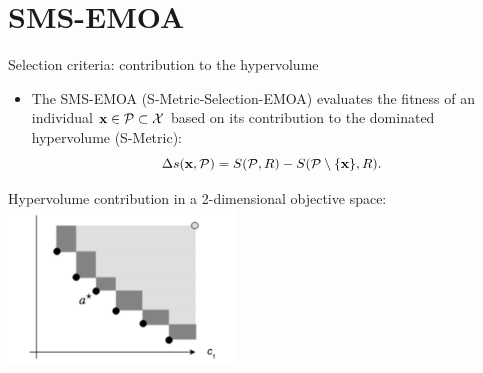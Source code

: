\section{SMS-EMOA}

\begin{frame}[allowframebreaks]{Selection criteria: contribution to the hypervolume}

\begin{itemize}
\item The SMS-EMOA (S-Metric-Selection-EMOA) evaluates the fitness of an individual $\mathbf{x} \in \mathcal{P} \subset \mathcal{X}$ based on its contribution to the dominated hypervolume (S-Metric):
$$
\Delta s(\mathbf{x}, \mathcal{P}) = S(\mathcal{P}, R) - S(\mathcal{P} \setminus \{ \mathbf{x}\}, R).
$$
\end{itemize}



\framebreak

\begin{center}
Hypervolume contribution in a 2-dimensional objective space:\\
\includegraphics[width = 0.45\textwidth]{images/hypervolumenbeitrag.png}
\end{center}


\end{frame}
